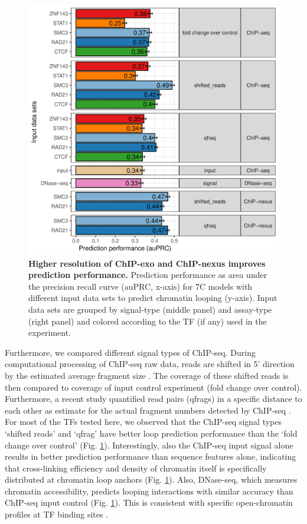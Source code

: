 \documentclass[a4paper,twoside=true,openright,parskip=full,chapterprefix=true,11pt,headings=normal,bibliography=totoc,listof=totoc,titlepage=on,captions=tableabove,draft=false]{scrreprt}
\theoremstyle{definition}
\theoremstyle{definition}
\theoremstyle{definition}
\theoremstyle{remark}
\begin{document}
\begin{figure}

{\centering \includegraphics[width=0.8\linewidth]{figures/loop_prediction/fig5_v04} 

}

\caption{\textbf{Higher resolution of ChIP-exo and ChIP-nexus
improves prediction performance.} Prediction performance as area under
the precision recall curve (auPRC, x-axis) for 7C models with different
input data sets to predict chromatin looping (y-axis). Input data sets
are grouped by signal-type (middle panel) and assay-type (right panel)
and colored according to the TF (if any) used in the experiment.}\label{fig:LoopPred5}
\end{figure}








Furthermore, we compared different signal types of ChIP-seq. During
computational processing of ChIP-seq raw data, reads are shifted in 5'
direction by the estimated average fragment size
\citep{Zhang2008, Hansen2015}. The coverage of these shifted reads is
then compared to coverage of input control experiment (fold change over
control). Furthermore, a recent study quantified read pairs (qfrags) in
a specific distance to each other as estimate for the actual fragment
numbers detected by ChIP-seq \citep{Hansen2015}. For most of the TFs
tested here, we observed that the ChIP-seq signal types `shifted reads'
and `qfrag' have better loop prediction performance than the `fold
change over control' (Fig. \ref{fig:LoopPred5}). Interestingly, also the
ChIP-seq input signal alone results in better prediction performance
than sequence features alone, indicating that cross-linking efficiency
and density of chromatin itself is specifically distributed at chromatin
loop anchors (Fig. \ref{fig:LoopPred5}). Also, DNase-seq, which measures
chromatin accessibility, predicts looping interactions with similar
accuracy than ChIP-seq input control (Fig. \ref{fig:LoopPred5}). This is
consistent with specific open-chromatin profiles at TF binding sites
\citep{Pique-Regi2011, Yardmc2014}.
\end{document}
